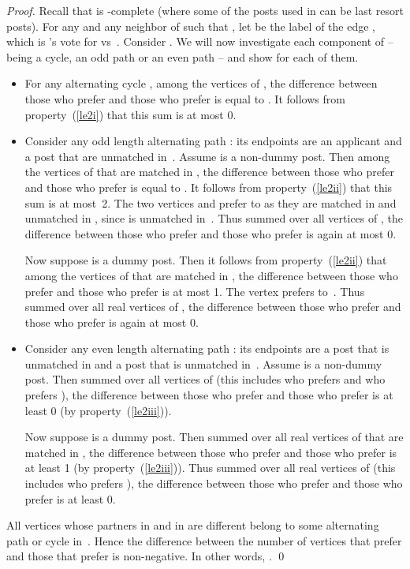 \documentclass[11pt]{llncs}
\begin{document}
\begin{proof}
Recall that  is -complete (where some of the posts used in  
can be last resort posts). For any  and any neighbor  of  such that , let  
be the label of the edge , which is 's vote for  vs~. Consider . We will now investigate each component of  -- being a cycle, an odd path or an even path -- and show  for each of them.
\begin{itemize}
\item For any alternating cycle , among the vertices of , the difference between those who prefer 
 and those who prefer  is equal to . It follows from property~(\ref{le2i}) 
that this sum is at most 0.

\item Consider any odd length alternating path : its endpoints are an applicant  and a post  that are 
unmatched in~. Assume  is a non-dummy post. Then among the vertices of  that are matched in , the difference between 
those who prefer  and those who prefer  is equal to . It follows from 
property~(\ref{le2ii}) that this sum is at most~2. The two vertices  and  prefer  to  as they are matched in  and 
unmatched in , since  is unmatched in~. Thus summed over all vertices of , the difference between those who prefer  and those who prefer  is 
again at most 0.

Now suppose  is a dummy post. Then it follows from property~(\ref{le2ii}) that among the vertices of  that are matched in 
, the difference between those who prefer  and those who prefer  is at most 1. The vertex  prefers  to~. Thus 
summed over all real vertices of , the difference between those who prefer  and those who prefer  is again at most 0.

\item Consider any even length alternating path : its endpoints are a post  that is unmatched in  
and a post  that is unmatched in~. Assume  is a non-dummy post. Then summed over all vertices of  
(this includes  who prefers  and  who prefers ), the difference between those who prefer  and those who prefer  
is at least 0 (by property~(\ref{le2iii})). 

Now suppose  is a dummy post.  Then summed over all real vertices of  that are matched in , the difference between those 
who prefer  and those who prefer  is at least 1 (by property~(\ref{le2iii})). Thus summed over all real vertices of  
(this includes  who prefers ), the difference between those who prefer  and those who prefer  is at least 0.
\end{itemize}
All vertices whose partners in  and in  are different belong to some alternating path or cycle in~. Hence 
the difference between the number of vertices that prefer  and those that prefer  is non-negative. In other words, 
. \qed
\end{proof}
\end{document}
